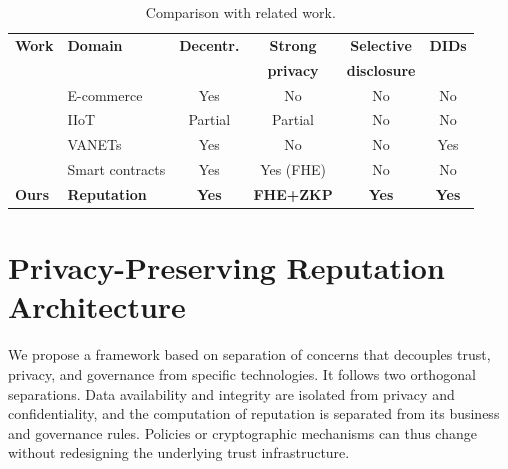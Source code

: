 \documentclass[conference]{IEEEtran}
\begin{document}
\begin{table}[t]
\centering
\caption{Comparison with related work.}
\label{tab:comparison}
\footnotesize
\setlength{\tabcolsep}{3pt}
\begin{tabular}{@{}llcccc@{}}
\toprule
\textbf{Work} & \textbf{Domain} & \textbf{Decentr.} & \textbf{Strong} & \textbf{Selective} & \textbf{DIDs}\\
 & & & \textbf{privacy} & \textbf{disclosure} & \\
\midrule
\cite{ZHOU2021155} & E-commerce & Yes & No & No & No \\
\cite{8640264} & IIoT & Partial & Partial & No & No \\
\cite{feraudo2024diva} & VANETs & Yes & No & No & Yes \\
\cite{solomon2023smartfhe} & Smart contracts & Yes & Yes (FHE) & No & No \\
\midrule
\textbf{Ours} & \textbf{Reputation} & \textbf{Yes} & \textbf{FHE+ZKP} & \textbf{Yes} & \textbf{Yes}\\
\bottomrule
\end{tabular}
\end{table}

\section{Privacy-Preserving Reputation Architecture}\label{sec:toid}
We propose a framework based on separation of concerns that decouples trust, privacy, and governance from specific technologies. It follows two orthogonal separations. Data availability and integrity are isolated from privacy and confidentiality, and the computation of reputation is separated from its business and governance rules. Policies or cryptographic mechanisms can thus change without redesigning the underlying trust infrastructure.
\end{document}
